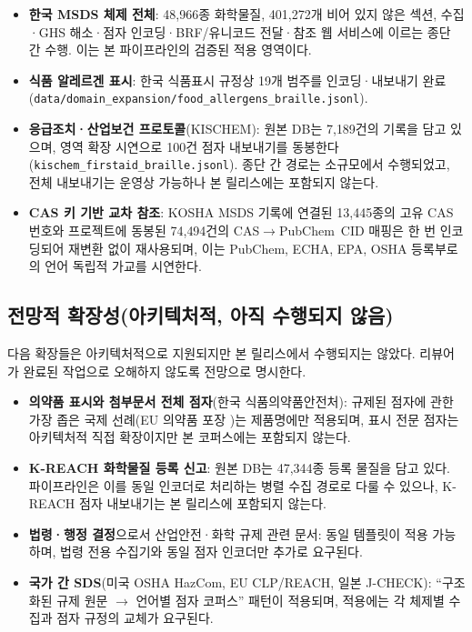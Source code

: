 \documentclass[journal]{IEEEtran}
\begin{document}
\begin{itemize}
\item \textbf{한국 MSDS 체제 전체}: 48{,}966종 화학물질, 401{,}272개 비어 있지 않은 섹션, 수집·GHS 해소·점자 인코딩·BRF/유니코드 전달·참조 웹 서비스에 이르는 종단 간 수행. 이는 본 파이프라인의 검증된 적용 영역이다.
\item \textbf{식품 알레르겐 표시}: 한국 식품표시 규정상 19개 범주를 인코딩·내보내기 완료(\texttt{data/domain\_expansion/food\_allergens\_braille.jsonl}).
\item \textbf{응급조치·산업보건 프로토콜}(KISCHEM): 원본 DB는 7{,}189건의 기록을 담고 있으며, 영역 확장 시연으로 100건 점자 내보내기를 동봉한다(\texttt{kischem\_firstaid\_braille.jsonl}). 종단 간 경로는 소규모에서 수행되었고, 전체 내보내기는 운영상 가능하나 본 릴리스에는 포함되지 않는다.
\item \textbf{CAS 키 기반 교차 참조}: KOSHA MSDS 기록에 연결된 13{,}445종의 고유 CAS 번호와 프로젝트에 동봉된 74{,}494건의 CAS$\rightarrow$PubChem~CID 매핑은 한 번 인코딩되어 재변환 없이 재사용되며, 이는 PubChem, ECHA, EPA, OSHA 등록부로의 언어 독립적 가교를 시연한다.
\end{itemize}

\subsection{전망적 확장성(아키텍처적, 아직 수행되지 않음)}

다음 확장들은 아키텍처적으로 지원되지만 본 릴리스에서 수행되지는 않았다. 리뷰어가 완료된 작업으로 오해하지 않도록 전망으로 명시한다.

\begin{itemize}
\item \textbf{의약품 표시와 첨부문서 전체 점자}(한국 식품의약품안전처): 규제된 점자에 관한 가장 좁은 국제 선례(EU 의약품 포장 \cite{eu_braille})는 제품명에만 적용되며, 표시 전문 점자는 아키텍처적 직접 확장이지만 본 코퍼스에는 포함되지 않는다.
\item \textbf{K-REACH 화학물질 등록 신고}: 원본 DB는 47{,}344종 등록 물질을 담고 있다. 파이프라인은 이를 동일 인코더로 처리하는 병렬 수집 경로로 다룰 수 있으나, K-REACH 점자 내보내기는 본 릴리스에 포함되지 않는다.
\item \textbf{법령·행정 결정}으로서 산업안전·화학 규제 관련 문서: 동일 템플릿이 적용 가능하며, 법령 전용 수집기와 동일 점자 인코더만 추가로 요구된다.
\item \textbf{국가 간 SDS}(미국 OSHA HazCom, EU CLP/REACH, 일본 J-CHECK): ``구조화된 규제 원문 $\rightarrow$ 언어별 점자 코퍼스'' 패턴이 적용되며, 적용에는 각 체제별 수집과 점자 규정의 교체가 요구된다.
\end{itemize}
\end{document}
